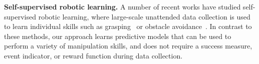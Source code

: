 
\noindent \textbf{Self-supervised robotic learning.}
A number of recent works have studied self-supervised robotic learning, where large-scale unattended data collection is used to learn individual skills such as grasping~\cite{mottaghi2016happens, lerrel,google_handeye, calandra2017feeling,pinto2016curious} or obstacle avoidance~\cite{greg_kahn_uncertainty,crashing}. %
In contrast to these methods, our approach learns predictive models that can be used to perform a variety of manipulation skills, and does not require a success measure, event indicator, or reward function during data collection.

